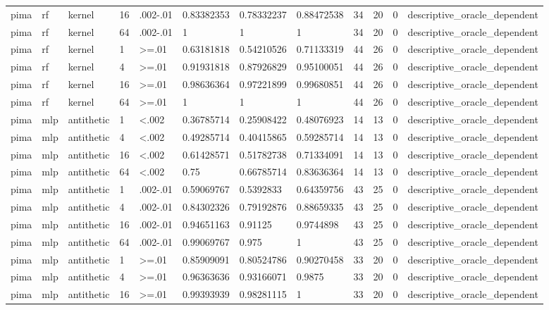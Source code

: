 \begin{tabular}{llllllllllll}
pima & rf & kernel & 16 & .002-.01 & 0.83382353 & 0.78332237 & 0.88472538 & 34 & 20 & 0 & descriptive\_oracle\_dependent \\
pima & rf & kernel & 64 & .002-.01 & 1 & 1 & 1 & 34 & 20 & 0 & descriptive\_oracle\_dependent \\
pima & rf & kernel & 1 & >=.01 & 0.63181818 & 0.54210526 & 0.71133319 & 44 & 26 & 0 & descriptive\_oracle\_dependent \\
pima & rf & kernel & 4 & >=.01 & 0.91931818 & 0.87926829 & 0.95100051 & 44 & 26 & 0 & descriptive\_oracle\_dependent \\
pima & rf & kernel & 16 & >=.01 & 0.98636364 & 0.97221899 & 0.99680851 & 44 & 26 & 0 & descriptive\_oracle\_dependent \\
pima & rf & kernel & 64 & >=.01 & 1 & 1 & 1 & 44 & 26 & 0 & descriptive\_oracle\_dependent \\
pima & mlp & antithetic & 1 & <.002 & 0.36785714 & 0.25908422 & 0.48076923 & 14 & 13 & 0 & descriptive\_oracle\_dependent \\
pima & mlp & antithetic & 4 & <.002 & 0.49285714 & 0.40415865 & 0.59285714 & 14 & 13 & 0 & descriptive\_oracle\_dependent \\
pima & mlp & antithetic & 16 & <.002 & 0.61428571 & 0.51782738 & 0.71334091 & 14 & 13 & 0 & descriptive\_oracle\_dependent \\
pima & mlp & antithetic & 64 & <.002 & 0.75 & 0.66785714 & 0.83636364 & 14 & 13 & 0 & descriptive\_oracle\_dependent \\
pima & mlp & antithetic & 1 & .002-.01 & 0.59069767 & 0.5392833 & 0.64359756 & 43 & 25 & 0 & descriptive\_oracle\_dependent \\
pima & mlp & antithetic & 4 & .002-.01 & 0.84302326 & 0.79192876 & 0.88659335 & 43 & 25 & 0 & descriptive\_oracle\_dependent \\
pima & mlp & antithetic & 16 & .002-.01 & 0.94651163 & 0.91125 & 0.9744898 & 43 & 25 & 0 & descriptive\_oracle\_dependent \\
pima & mlp & antithetic & 64 & .002-.01 & 0.99069767 & 0.975 & 1 & 43 & 25 & 0 & descriptive\_oracle\_dependent \\
pima & mlp & antithetic & 1 & >=.01 & 0.85909091 & 0.80524786 & 0.90270458 & 33 & 20 & 0 & descriptive\_oracle\_dependent \\
pima & mlp & antithetic & 4 & >=.01 & 0.96363636 & 0.93166071 & 0.9875 & 33 & 20 & 0 & descriptive\_oracle\_dependent \\
pima & mlp & antithetic & 16 & >=.01 & 0.99393939 & 0.98281115 & 1 & 33 & 20 & 0 & descriptive\_oracle\_dependent \\

\end{tabular}
